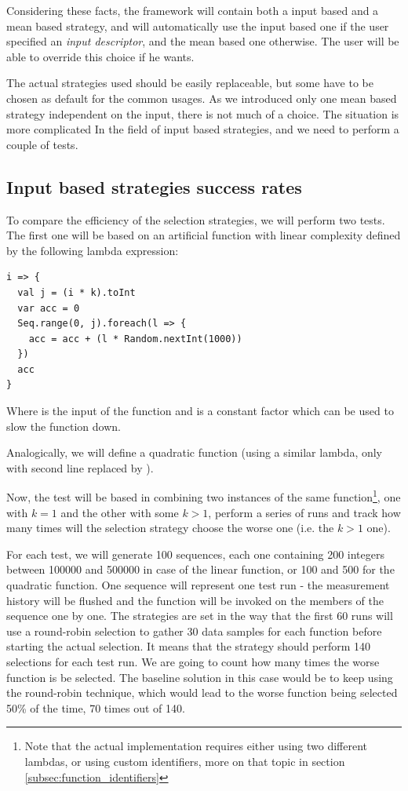 Considering these facts, the framework will contain both a input based and a mean based strategy, and will automatically use the input based one if the user specified an \textit{input descriptor}, and the mean based one otherwise. The user will be able to override this choice if he wants.

The actual strategies used should be easily replaceable, but some have to be chosen as default for the common usages. As we introduced only one mean based strategy independent on the input, there is not much of a choice. The situation is more complicated In the field of input based strategies, and we need to perform a couple of tests.

\subsection{Input based strategies success rates}
\label{subsec:input_based_strategies_success}

To compare the efficiency of the selection strategies, we will perform two tests. The first one will be based on an artificial function with linear complexity defined by the following lambda expression:

\lstset{style=Scala}
\begin{lstlisting}
i => {
  val j = (i * k).toInt
  var acc = 0
  Seq.range(0, j).foreach(l => {
    acc = acc + (l * Random.nextInt(1000))
  })
  acc
}
\end{lstlisting}

Where  is the input of the function and  is a constant factor which can be used to slow the function down.

Analogically, we will define a quadratic function (using a similar lambda, only with second line replaced by ).

Now, the test will be based in combining two instances of the same function\footnote{Note that the actual implementation requires either using two different lambdas, or using custom identifiers, more on that topic in section \ref{subsec:function_identifiers}}, one with $k=1$ and the other with some $k>1$, perform a series of runs and track how many times will the selection strategy choose the worse one (i.e. the $k>1$ one).

For each test, we will generate 100 sequences, each one containing 200 integers between 100000 and 500000 in case of the linear function, or 100 and 500 for the quadratic function. One sequence will represent one test run - the measurement history will be flushed and the function will be invoked on the members of the sequence one by one. The strategies are set in the way that the first 60 runs will use a round-robin selection to gather 30 data samples for each function before starting the actual selection. It means that the strategy should perform 140 selections for each test run. We are going to count how many times the worse function is be selected. The baseline solution in this case would be to keep using the round-robin technique, which would lead to the worse function being selected 50\% of the time, 70 times out of 140.

